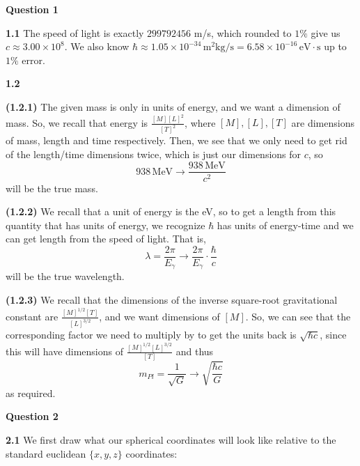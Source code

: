 \documentclass[10pt]{article}
\begin{document}
\textbf{Question 1}

\textbf{1.1} The speed of light is exactly $299792456$ m/s, which rounded to $1\% $ give us $c \approx 3.00\times 10^{8}$. We also know $\hbar \approx 1.05 \times 10 ^{-34} \, \text{m}^{2}\text{kg}/\text{s} = 6.58 \times 10^{-16} \, \text{eV}\cdot \text{s}$ up to $1\% $ error.

\textbf{1.2}

\textbf{(1.2.1)} The given mass is only in units of energy, and we want a dimension of mass. So, we recall that energy is $\frac{[M][L]^{2}}{[T]^{2}}$, where $[M],[L],[T]$ are dimensions of mass, length and time respectively. Then, we see that we only need to get rid of the length/time dimensions twice, which is just our dimensions for $c$, so
\[ 938 \,\text{MeV} \to \frac{938 \, \text{MeV}}{c^{2}} \]
will be the true mass.

\textbf{(1.2.2)} We recall that a unit of energy is the eV, so to get a length from this quantity that has units of energy, we recognize $\hbar$ has units of energy-time and we can get length from the speed of light. That is,
\[ \lambda = \frac{2\pi}{E_{\gamma}} \to \frac{2\pi}{E_{\gamma}}\cdot \frac{\hbar}{c} \]
will be the true wavelength.

\textbf{(1.2.3)} We recall that the dimensions of the inverse square-root gravitational constant are $\frac{[M]^{1/2}[T]}{[L]^{3/2}}$, and we want dimensions of $[M]$. So, we can see that the corresponding factor we need to multiply by to get the units back is $\sqrt{\hbar c}$, since this will have dimensions of $\frac{[M]^{1/2}[L]^{3/2}}{[T]}$ and thus
\[ m_{Pl} = \frac{1}{\sqrt{G}} \to \sqrt{\frac{\hbar c}{G}} \]
as required.

\newpage
\textbf{Question 2}

\textbf{2.1} We first draw what our spherical coordinates will look like relative to the standard euclidean $\{x,y,z\}$ coordinates:
\begin{center}
\end{center}
\end{document}
